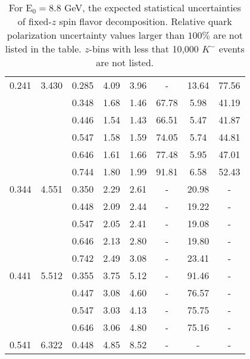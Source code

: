 \begin{table}[htbp]
\begin{center}
\begin{tabular}{|ccc||ccccc|}
   0.241 &   3.430 &   0.285 &         4.09 &         3.96 &            - &        13.64 &        77.56 \\
         &          &    0.348 &         1.68 &         1.46 &        67.78 &         5.98 &        41.19 \\
         &          &    0.446 &         1.54 &         1.43 &        66.51 &         5.47 &        41.87 \\
         &          &    0.547 &         1.58 &         1.59 &        74.05 &         5.74 &        44.81 \\
         &          &    0.646 &         1.61 &         1.66 &        77.48 &         5.95 &        47.01 \\
         &          &    0.744 &         1.80 &         1.99 &        91.81 &         6.58 &        52.43 \\
   0.344 &   4.551 &   0.350 &         2.29 &         2.61 &            - &        20.98 &            - \\
         &          &    0.448 &         2.09 &         2.44 &            - &        19.22 &            - \\
         &          &    0.547 &         2.05 &         2.41 &            - &        19.08 &            - \\
         &          &    0.646 &         2.13 &         2.80 &            - &        19.80 &            - \\
         &          &    0.742 &         2.49 &         3.08 &            - &        23.41 &            - \\
   0.441 &   5.512 &   0.355 &         3.75 &         5.12 &            - &        91.46 &            - \\
         &          &    0.447 &         3.08 &         4.60 &            - &        76.57 &            - \\
         &          &    0.547 &         3.03 &         4.13 &            - &        75.75 &            - \\
         &          &    0.646 &         3.06 &         4.80 &            - &        75.16 &            - \\
   0.541 &   6.322 &   0.448 &         4.85 &         8.52 &            - &            - &            - \\
\hline
\end{tabular}
\end{center}
\caption{\label{tab:purity2}  For E$_0=8.8 $ GeV,
the expected statistical uncertainties of  fixed-$z$ spin flavor decomposition.  Relative quark polarization  uncertainty values larger than $100 \%$ are not listed in the table.  $z$-bins with less that 10,000 $K^-$ events are not listed.
}
\end{table}
%

